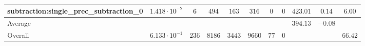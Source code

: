 \begin{tabular}{|l|c|c|c|c|c|c|c|c|c|c|}
subtraction:single\_prec\_subtraction\_0         & $ 1.418 \cdot 10^{-2} $ & $ 6      $ & $ 494  $ & $ 163  $ & $ 316   $ & $ 0  $ & $ 0 $ & $ 423.01      $ & $ 0.14    $ & $ 6.00    $ \\
\hline
Average                                          & $                     $ & $        $ & $      $ & $      $ & $       $ & $    $ & $   $ & $ 394.13      $ & $ -0.08   $ & $         $ \\
\hline
Overall                                          & $ 6.133 \cdot 10^{-1} $ & $ 236    $ & $ 8186 $ & $ 3443 $ & $ 9660  $ & $ 77 $ & $ 0 $ & $             $ & $         $ & $ 66.42   $ \\
\hline
\end{tabular}
